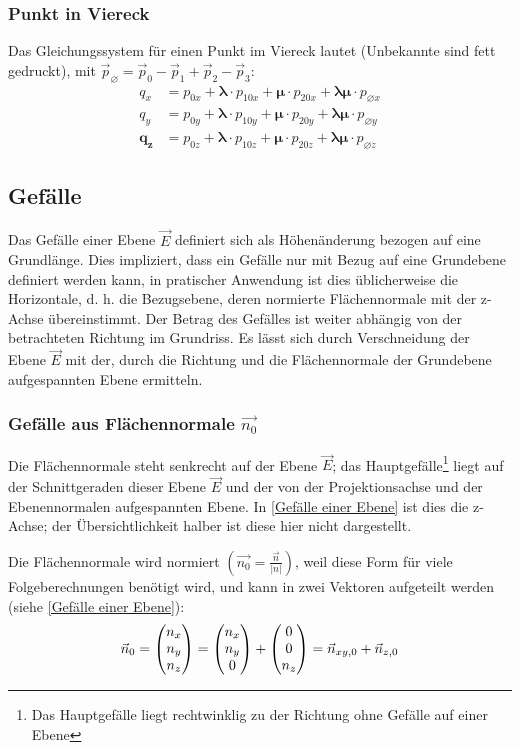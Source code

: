 \subsubsection{Punkt in Viereck}
Das Gleichungssystem für einen Punkt im Viereck lautet (Unbekannte sind fett gedruckt), mit $\vec{p}_{\varnothing} = \vec{p}_{0} - \vec{p}_{1} + \vec{p}_{2} - \vec{p}_{3}$:
\begin{align}
	\label{GSQD1} q_{x} &= p_{0x} + \bm{\lambda} \cdot p_{10x} + \bm{\mu} \cdot p_{20x} + \bm{\lambda}\bm{\mu} \cdot p_{\varnothing x} \\
	\label{GSQD2} q_{y} &= p_{0y} + \bm{\lambda} \cdot p_{10y} + \bm{\mu} \cdot p_{20y} + \bm{\lambda}\bm{\mu} \cdot p_{\varnothing y} \\
	\label{GSQD3} \bm{q_{z}} &= p_{0z} + \bm{\lambda} \cdot p_{10z} + \bm{\mu} \cdot p_{20z} + \bm{\lambda}\bm{\mu} \cdot p_{\varnothing z}
\end{align}

\subsection{Gefälle}
Das Gefälle einer Ebene $\vec{E}$ definiert sich als Höhenänderung bezogen auf eine Grundlänge. Dies impliziert, dass ein Gefälle nur mit Bezug auf eine Grundebene definiert werden kann, in pratischer Anwendung ist dies üblicherweise die Horizontale, d. h. die Bezugsebene, deren normierte Flächennormale mit der z-Achse übereinstimmt. Der Betrag des Gefälles ist weiter abhängig von der betrachteten Richtung im Grundriss. Es lässt sich durch Verschneidung der Ebene $\vec{E}$ mit der, durch die Richtung und die Flächennormale der Grundebene aufgespannten Ebene ermitteln.

\subsubsection{Gefälle aus Flächennormale $\vec{n_{0}}$}
Die Flächennormale steht senkrecht auf der Ebene $\vec{E}$; das Hauptgefälle\footnote{Das Hauptgefälle liegt rechtwinklig zu der Richtung ohne Gefälle auf einer Ebene} liegt auf der Schnittgeraden dieser Ebene $\vec{E}$ und der von der Projektionsachse und der Ebenennormalen aufgespannten Ebene. In \cref{Gefälle einer Ebene} ist dies die z-Achse; der Übersichtlichkeit halber ist diese hier nicht dargestellt.

Die Flächennormale wird normiert $(\vec{n_{0}} = \frac{\vec{n}}{|n|})$, weil diese Form für viele Folgeberechnungen benötigt wird, und kann in zwei Vektoren aufgeteilt werden (siehe \cref{Gefälle einer Ebene}):
\begin{equation*}
	\vec{n}_{0} = \begin{pmatrix} n_{x} \\ n_{y} \\ n_{z} \end{pmatrix}
	=\begin{pmatrix} n_{x} \\ n_{y} \\ 0 \end{pmatrix} + \begin{pmatrix} 0 \\ 0 \\ n_{z} \end{pmatrix}
	=\vec{n}_{xy, 0} + \vec{n}_{z, 0}
\end{equation*}

